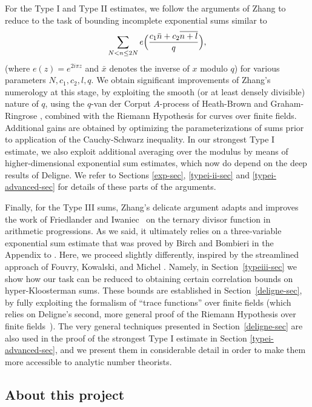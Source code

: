 \documentclass[12pt,a4paper,reqno]{amsart}
\numberwithin{equation}{section}
\theoremstyle{plain}
\theoremstyle{definition}
\begin{document}
For the Type I and Type II estimates, we follow the arguments of Zhang
to reduce to the task of bounding incomplete exponential sums similar
to
$$ \sum_{N<n\leq 2N}
e\Bigl(\frac{c_1\bar{n}+c_2\overline{n+l}}{q}\Bigr),
$$
(where $e(z)=e^{2i\pi z}$ and $\bar{x}$ denotes the inverse of $x$
modulo $q$) for various parameters $N, c_1, c_2, l, q$.  We obtain
significant improvements of Zhang's numerology at this stage, by
exploiting the smooth (or at least densely divisible) nature of $q$,
using the $q$-van der Corput $A$-process of Heath-Brown
\cite{heath-hybrid} and Graham-Ringrose \cite{graham}, combined with
the Riemann Hypothesis for curves over finite fields. Additional gains
are obtained by optimizing the parameterizations of sums prior to
application of the Cauchy-Schwarz inequality. In our strongest Type I
estimate, we also exploit additional averaging over the modulus by
means of higher-dimensional exponential sum estimates, which now do
depend on the deep results of Deligne.  We refer to Sections
\ref{exp-sec}, \ref{typei-ii-sec} and \ref{typei-advanced-sec} for
details of these parts of the arguments.

Finally, for the Type III sums, Zhang's delicate argument \cite{zhang}
adapts and improves the work of Friedlander and Iwaniec~\cite{fi-3} on
the ternary divisor function in arithmetic progressions.  As we said,
it ultimately relies on a three-variable exponential sum estimate that
was proved by Birch and Bombieri in the Appendix to \cite{fi-3}.
Here, we proceed slightly differently, inspired by the streamlined
approach of Fouvry, Kowalski, and Michel \cite{FKM3}.  Namely, in
Section~\ref{typeiii-sec} we show how our task can be reduced to
obtaining certain correlation bounds on hyper-Kloosterman sums.  These
bounds are established in Section~\ref{deligne-sec}, by fully
exploiting the formalism of ``trace functions'' over finite fields
(which relies on Deligne's second, more general proof of the Riemann
Hypothesis over finite fields~\cite{WeilII}).  The very general
techniques presented in Section~\ref{deligne-sec} are also used in the
proof of the strongest Type I estimate in Section
\ref{typei-advanced-sec}, and we present them in considerable detail
in order to make them more accessible to analytic number theorists.

\subsection{About this project}
\end{document}

